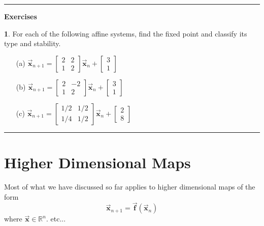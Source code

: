 \documentclass[reqno]{immbook}
\newcommand{\Real}{\mathbb{R}}
\newcommand{\BF}{\vec{\textbf{f}}}
\newcommand{\BX}{\vec{\textbf{x}}}
\newcommand{\ds}{\displaystyle}
\numberwithin{equation}{chapter}
\numberwithin{question}{section}
\numberwithin{theorem}{chapter}
\numberwithin{figure}{chapter}
\theoremstyle{definition}
\newtheorem{exercise}{}[section]
\newenvironment{exercises}%
{%
\medskip\hrule\medskip\noindent\textbf{Exercises}%
}%
{%
\medskip\hrule
}
\begin{document}
\begin{exercises}
\begin{exercise}
For each of the following affine systems, find the
fixed point and classify its type and stability.
\begin{enumerate}
\item[(a)] $\ds \BX_{n+1} = \begin{bmatrix}
                         2 & 2 \\
                         1 & 2
                     \end{bmatrix}
                        \BX_n + \begin{bmatrix} 3 \\ 1 \end{bmatrix}$
\item[(b)] $\ds \BX_{n+1} = \begin{bmatrix}
                         2 & -2 \\
                         1 & 2
                     \end{bmatrix}
                        \BX_n + \begin{bmatrix} 3 \\ 1 \end{bmatrix}$
\item[(c)] $\ds \BX_{n+1} = \begin{bmatrix}
                         1/2 & 1/2 \\
                         1/4 & 1/2
                     \end{bmatrix}
                        \BX_n + \begin{bmatrix} 2 \\ 8 \end{bmatrix}$
\end{enumerate}
\end{exercise}
\end{exercises}

\section{Higher Dimensional Maps}
%
Most of what we have discussed so far applies to
higher dimensional maps of the form
\begin{equation}
  \BX_{n+1} = \BF(\BX_n)
\end{equation}
where $\BX \in \Real^n$. etc...
\end{document}
